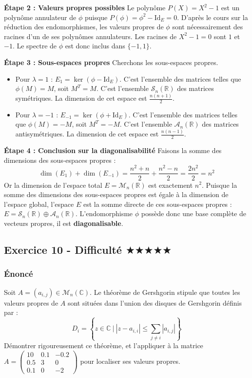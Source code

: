\documentclass[11pt,a4paper]{article}
\begin{document}
\textbf{Étape 2 : Valeurs propres possibles}
Le polynôme $P(X) = X^2 - 1$ est un polynôme annulateur de $\phi$ puisque $P(\phi) = \phi^2 - \text{Id}_E = 0$.
D'après le cours sur la réduction des endomorphismes, les valeurs propres de $\phi$ sont nécessairement des racines d'un de ses polynômes annulateurs.
Les racines de $X^2 - 1 = 0$ sont $1$ et $-1$.
Le spectre de $\phi$ est donc inclus dans $\{-1, 1\}$.

\textbf{Étape 3 : Sous-espaces propres}
Cherchons les sous-espaces propres.
\begin{itemize}
\item Pour $\lambda = 1$ : $E_1 = \ker(\phi - \text{Id}_E)$. C'est l'ensemble des matrices telles que $\phi(M) = M$, soit $M^T = M$. C'est l'ensemble $\mathcal{S}_n(\mathbb{R})$ des matrices symétriques. La dimension de cet espace est $\frac{n(n+1)}{2}$.
\item Pour $\lambda = -1$ : $E_{-1} = \ker(\phi + \text{Id}_E)$. C'est l'ensemble des matrices telles que $\phi(M) = -M$, soit $M^T = -M$. C'est l'ensemble $\mathcal{A}_n(\mathbb{R})$ des matrices antisymétriques. La dimension de cet espace est $\frac{n(n-1)}{2}$.
\end{itemize}
\textbf{Étape 4 : Conclusion sur la diagonalisabilité}
Faisons la somme des dimensions des sous-espaces propres :
$$\dim(E_1) + \dim(E_{-1}) = \frac{n^2 + n}{2} + \frac{n^2 - n}{2} = \frac{2n^2}{2} = n^2$$
Or la dimension de l'espace total $E = \mathcal{M}_n(\mathbb{R})$ est exactement $n^2$.
Puisque la somme des dimensions des sous-espaces propres est égale à la dimension de l'espace global, l'espace $E$ est la somme directe de ces sous-espaces propres : $E = \mathcal{S}_n(\mathbb{R}) \oplus \mathcal{A}_n(\mathbb{R})$.
L'endomorphisme $\phi$ possède donc une base complète de vecteurs propres, il est \textbf{diagonalisable}.


\subsection*{Exercice 10 - Difficulté \quad $\bigstar$$\bigstar$$\bigstar$$\bigstar$$\bigstar$}

\subsubsection*{Énoncé}
Soit $A = (a_{i,j}) \in \mathcal{M}_n(\mathbb{C})$. Le théorème de Gershgorin stipule que toutes les valeurs propres de $A$ sont situées dans l'union des disques de Gershgorin définis par :
$$D_i = \left\{ z \in \mathbb{C} \ \Bigg| \ |z - a_{i,i}| \leq \sum_{j \neq i} |a_{i,j}| \right\}$$
Démontrer rigoureusement ce théorème, et l'appliquer à la matrice $A = \begin{pmatrix} 10 & 0.1 & -0.2 \\ 0.5 & 3 & 0 \\ 0.1 & 0 & -2 \end{pmatrix}$ pour localiser ses valeurs propres.
\end{document}
